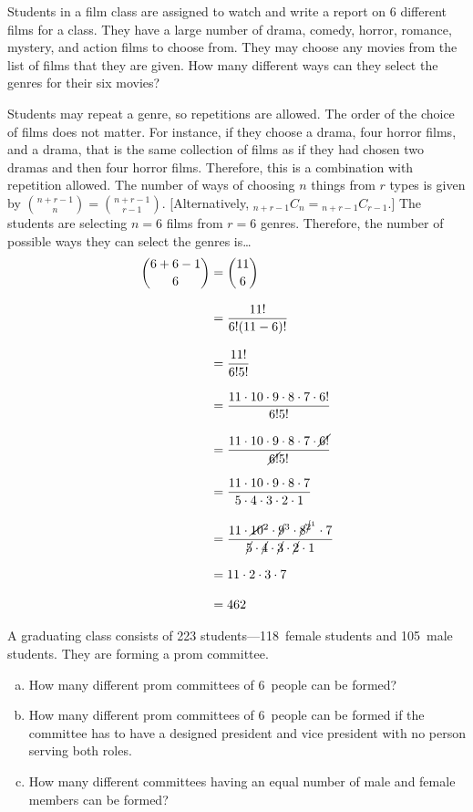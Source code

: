 \documentclass[11pt,letterpaper]{article}
\begin{document}
\newpage



 Students in a film class are assigned to watch and write a report on 6 different films for a class. They have a large number of drama, comedy, horror, romance, mystery, and action films to choose from. They may choose any movies from the list of films that they are given. How many different ways can they select the genres for their six movies? \pspace

\sol Students may repeat a genre, so repetitions are allowed. The order of the choice of films does not matter. For instance, if they choose a drama, four horror films, and a drama, that is the same collection of films as if they had chosen two dramas and then four horror films. Therefore, this is a combination with repetition allowed. The number of ways of choosing $n$ things from $r$ types is given by $\binom{n + r - 1}{n}= \binom{n + r - 1}{r - 1}$. [Alternatively, ${}_{n + r - 1}C_n= {}_{n + r - 1}C_{r - 1}$.] The students are selecting $n= 6$ films from $r= 6$ genres. Therefore, the number of possible ways they can select the genres is\dots
	\[
	\begin{aligned}
	\binom{6 + 6 - 1}{6}&= \binom{11}{6} \\[0.3cm]
	&= \dfrac{11!}{6! (11 - 6)!} \\[0.3cm]
	&= \dfrac{11!}{6! 5!} \\[0.3cm]
	&= \dfrac{11 \cdot 10 \cdot 9 \cdot 8 \cdot 7 \cdot 6!}{6! 5!} \\[0.3cm]
	&= \dfrac{11 \cdot 10 \cdot 9 \cdot 8 \cdot 7 \cdot \cancel{6!}}{\cancel{6!} 5!} \\[0.3cm]
	&= \dfrac{11 \cdot 10 \cdot 9 \cdot 8 \cdot 7}{5 \cdot 4 \cdot 3 \cdot 2 \cdot 1} \\[0.3cm]
	&= \dfrac{11 \cdot \cancel{10}^2 \cdot \cancel{9}^3 \cdot \cancel{8}^{\cancel{2}^1} \cdot 7}{\cancel{5} \cdot \cancel{4} \cdot \cancel{3} \cdot \cancel{2} \cdot 1} \\[0.3cm]
	&= 11 \cdot 2 \cdot 3 \cdot 7 \\[0.3cm]
	&= 462
	\end{aligned}
	\]



\newpage



 A graduating class consists of 223 students---118~female students and 105~male students. They are forming a prom committee. 
	\begin{enumerate}[(a)]
	\item How many different prom committees of 6~people can be formed?
	\item How many different prom committees of 6~people can be formed if the committee has to have a designed president and vice president with no person serving both roles. 
	\item How many different committees having an equal number of male and female members can be formed?
	\end{enumerate} \pspace
\end{document}
